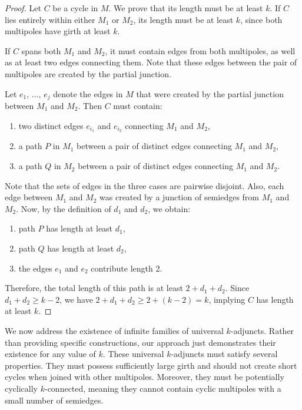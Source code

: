 \documentclass[12pt, twoside]{book}
\begin{document}
\begin{proof}
	Let $C$ be a cycle in $M$. We prove that its length must be at least $k$. If $C$ lies entirely within either $M_1$ or $M_2$, its length must be at least $k$, since both multipoles have girth at least $k$.
	
	If $C$ spans both $M_1$ and $M_2$, it must contain edges from both multipoles, as well as at least two edges connecting them. Note that these edges between the pair of multipoles are created by the partial junction.
	
	Let $e_1,\,\dots,\,e_j$ denote the edges in $M$ that were created by the partial junction between $M_1$ and $M_2$. Then $C$ must contain:
	\begin{enumerate}[label=(\roman*)]
		\item two distinct edges $e_{i_1}$ and $e_{i_2}$ connecting $M_1$ and $M_2$,
		\item a path $P$ in $M_1$ between a pair of distinct edges connecting $M_1$ and $M_2$,
		\item a path $Q$ in $M_2$ between a pair of distinct edges connecting $M_1$ and $M_2$.
	\end{enumerate}
	Note that the sets of edges in the three cases are pairwise disjoint. Also, each edge between $M_1$ and $M_2$ was created by a junction of semiedges from $M_1$ and $M_2$. Now, by the definition of $d_1$ and $d_2$, we obtain:
	
	\begin{enumerate}[label=(\roman*)]
		\item path $P$ has length at least $d_1$,
		\item path $Q$ has length at least $d_2$,
		\item the edges $e_1$ and $e_2$ contribute length 2.
	\end{enumerate}
	
	Therefore, the total length of this path is at least $2+d_1+d_2$. Since $d_1+d_2\geq k-2$, we have $2+d_1+d_2\geq 2+(k-2)=k$, implying $C$ has length at least $k$.
\end{proof}

We now address the existence of infinite families of universal $k$-adjuncts. Rather than providing specific constructions, our approach just demonstrates their existence for any value of $k$. These universal $k$-adjuncts must satisfy several properties. They must possess sufficiently large girth and should not create short cycles when joined with other multipoles. Moreover, they must be potentially cyclically $k$-connected, meaning they cannot contain cyclic multipoles with a small number of semiedges.
\end{document}
